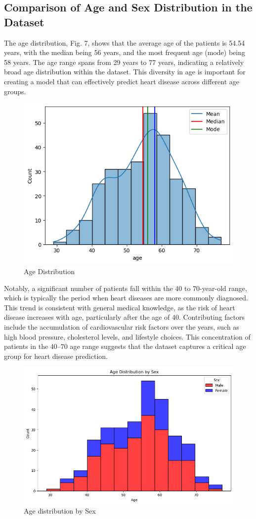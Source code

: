 \subsection{Comparison of Age and Sex Distribution in the Dataset}
The age distribution, Fig. 7, shows that the average age of the patients is 54.54 years, with the median being 56 years, and the most frequent age (mode) being 58 years. The age range spans from 29 years to 77 years, indicating a relatively broad age distribution within the dataset. This diversity in age is important for creating a model that can effectively predict heart disease across different age groups.

\begin{figure}[ht]
    \centering
    \includegraphics[width=0.8\linewidth]{images/age_distribution.png}
    \caption{Age Distribution}
    \label{fig:enter-label}
\end{figure}
\hfill \break

Notably, a significant number of patients fall within the 40 to 70-year-old range, which is typically the period when heart diseases are more commonly diagnosed. This trend is consistent with general medical knowledge, as the risk of heart disease increases with age, particularly after the age of 40. Contributing factors include the accumulation of cardiovascular risk factors over the years, such as high blood pressure, cholesterol levels, and lifestyle choices. This concentration of patients in the 40–70 age range suggests that the dataset captures a critical age group for heart disease prediction.

\begin{figure}[ht]
    \centering
    \includegraphics[width=0.8\linewidth]{images/women_men.png}
    \caption{Age distribution by Sex}
    \label{fig:enter-label}
\end{figure}

